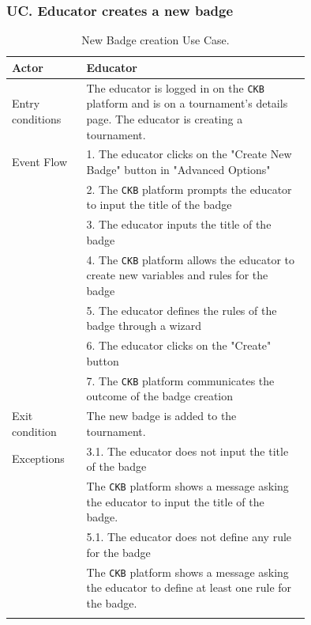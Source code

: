\subsubsection*{UC\cuc . Educator creates a new badge}
\begin{center}
    \begin{longtable}{lp{0.75\linewidth}}
        \hline
        Actor            & Educator \\
        \hline
        Entry conditions & The educator is logged in on the \verb|CKB| platform and is on a tournament's details page. The educator is creating a tournament.\\
        \hline
        Event Flow      
        & 1. The educator clicks on the "Create New Badge" button in "Advanced Options"\\
        & 2. The \verb|CKB| platform prompts the educator to input the title of the badge\\
        & 3. The educator inputs the title of the badge\\
        & 4. The \verb|CKB| platform allows the educator to create new variables and rules for the badge\\
        & 5. The educator defines the rules of the badge through a wizard\\
        & 6. The educator clicks on the "Create" button\\
        & 7. The \verb|CKB| platform communicates the outcome of the badge creation\\
        \hline
        Exit condition   & The new badge is added to the tournament.   \\
        \hline
        Exceptions
        & 3.1. The educator does not input the title of the badge\\
            & The \verb|CKB| platform shows a message asking the educator to input the title of the badge.  \\
        & 5.1. The educator does not define any rule for the badge\\
            & The \verb|CKB| platform shows a message asking the educator to define at least one rule for the badge.  \\
        \hline
        \caption{New Badge creation Use Case.}
        \label{tab: badge_creation_use_case}
    \end{longtable}

\end{center}

